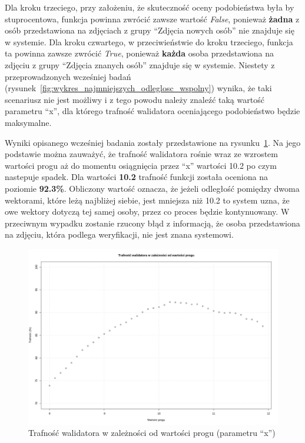 Dla kroku trzeciego, przy założeniu, że skuteczność oceny podobieństwa była by stuprocentowa, funkcja
powinna zwrócić zawsze wartość \textit{False}, ponieważ \textbf{żadna} z osób przedstawiona
na zdjęciach z grupy ``Zdjęcia nowych osób'' nie znajduje się w systemie.
Dla kroku czwartego, w przeciwieństwie do kroku trzeciego, funkcja ta powinna
zawsze zwrócić \textit{True}, ponieważ \textbf{każda}
osoba przedstawiona na zdjęciu z grupy ``Zdjęcia znanych osób'' znajduje się w systemie.
Niestety z przeprowadzonych wcześniej badań (rysunek~\ref{fig:wykres_najmniejszych_odleglosc_wspolny}) wynika,
że taki scenariusz nie jest możliwy i z tego powodu należy znaleźć taką wartość parametru ``x'',
dla którego trafność walidatora oceniającego podobieństwo będzie maksymalne.

Wyniki opisanego wcześniej badania zostały przedstawione na rysunku~\ref{fig:tranosc_walidatora_per_prog}.
Na jego podstawie można zauważyć, że trafność walidatora
rośnie wraz ze wzrostem wartości progu aż do momentu osiągnięcia
przez ``x'' wartości \num{10.2} po czym nastepuje spadek.
Dla wartości \textbf{10.2} trafność funkcji została oceniona na poziomie \textbf{92.3\%}.
Obliczony wartość oznacza, że jeżeli odległość pomiędzy dwoma wektorami, które leżą najbliżej siebie,
jest mniejsza niż \num{10.2} to system uzna, że owe wektory dotyczą tej samej osoby,
przez co proces będzie kontynuowany.
W przeciwnym wypadku zostanie rzucony błąd z informacją, że osoba przedstawiona na zdjęciu,
która podlega weryfikacji, nie jest znana systemowi.

\begin{figure}[]
    \centering
    \includegraphics[width=1\textwidth]{images/trafnosc_walidator_a_prog}
    \caption{ Trafność walidatora w zależności od wartości progu (parametru ``x'') }
    \customsource
    \label{fig:tranosc_walidatora_per_prog}
\end{figure}

